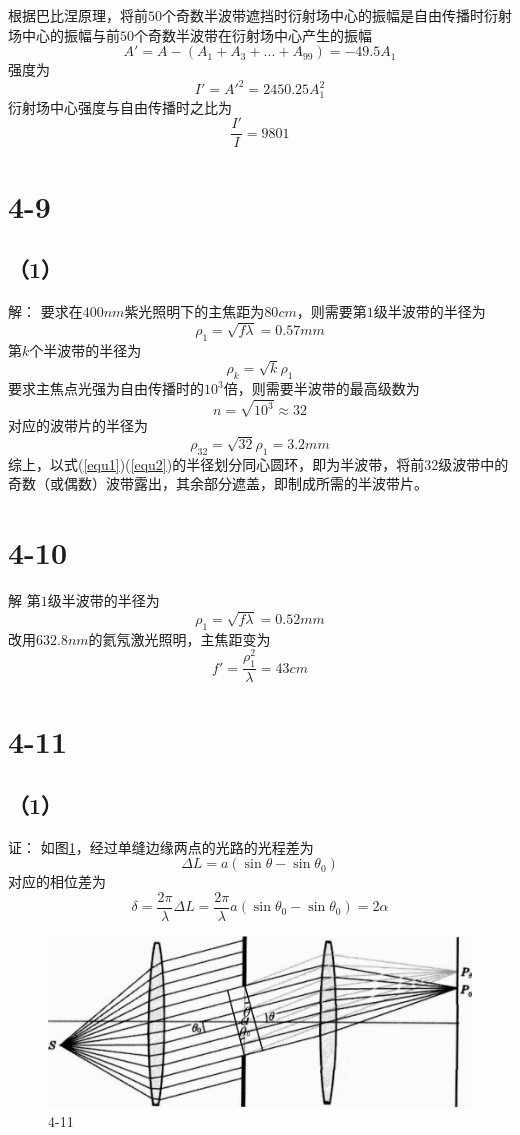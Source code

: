 \documentclass[10pt,a4paper]{article}
\begin{document}
\noindent 根据巴比涅原理，将前$50$个奇数半波带遮挡时衍射场中心的振幅是自由传播时衍射场中心的振幅与前$50$个奇数半波带在衍射场中心产生的振幅
\[
A'=A-(A_1+A_3+...+A_{99})=-49.5A_1
\]
强度为
\[
I'=A'^2=2450.25A_1^2
\]
衍射场中心强度与自由传播时之比为
\[
\frac{I'}{I}=9801
\]
\section*{4-9}
\subsection*{（1）}解：
要求在$400nm$紫光照明下的主焦距为$80cm$，则需要第$1$级半波带的半径为
\begin{equation}
\label{equ1}
\rho_1=\sqrt{f\lambda}=0.57mm
\end{equation}
第$k$个半波带的半径为
\begin{equation}
\label{equ2}
\rho_k=\sqrt{k}\rho_1
\end{equation}
要求主焦点光强为自由传播时的$10^3$倍，则需要半波带的最高级数为
\[
n=\sqrt{10^3}\approx32
\]
对应的波带片的半径为
\[
\rho_{32}=\sqrt{32}\rho_1=3.2mm
\]
综上，以式(\ref{equ1})(\ref{equ2})的半径划分同心圆环，即为半波带，将前$32$级波带中的奇数（或偶数）波带露出，其余部分遮盖，即制成所需的半波带片。
\section*{4-10}解
第$1$级半波带的半径为
\[
\rho_1=\sqrt{f\lambda}=0.52mm
\]
改用$632.8nm$的氦氖激光照明，主焦距变为
\[
f'=\frac{\rho_1^2}{\lambda}=43cm
\]
\section*{4-11}
\subsection*{（1）}证：
如图\ref{OpticsHomework_6_4-11}，经过单缝边缘两点的光路的光程差为
\[
\Delta L=a(\sin\theta-\sin\theta_0)
\]
对应的相位差为
\[
\delta=\frac{2\pi}{\lambda}\Delta L=\frac{2\pi}{\lambda}a(\sin\theta_0-\sin\theta_0)=2\alpha
\]
\begin{figure}[h]
\centering
\includegraphics[scale=.4]{OpticsHomework_6_4-11.jpg}
\caption{4-11}\label{OpticsHomework_6_4-11}
\end{figure}
\end{document}
